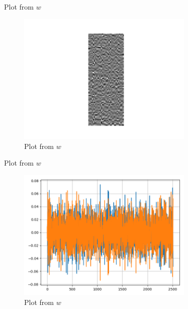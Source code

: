 \documentclass[handout]{beamer}
\begin{document}

\begin{frame}{Plot from $w$}
    {\centering
    \begin{figure}[H]
        \includegraphics[width=0.75\textwidth]{project_03/ww.png}
        \caption{Plot from $w$}
    \end{figure}
    }
\end{frame}

\begin{frame}{Plot from $w$}
    {\centering
    \begin{figure}[H]
        \includegraphics[width=0.75\textwidth]{project_03/W.png}
        \caption{Plot from $w$}
    \end{figure}
    }
\end{frame}
\end{document}
